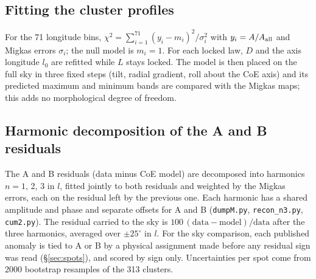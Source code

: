 \documentclass[10pt,twocolumn]{article}
\begin{document}
\subsection{Fitting the cluster profiles}
For the 71 longitude bins, $\chi^2=\sum_{i=1}^{71}(y_i-m_i)^2/\sigma_i^2$ with $y_i=A/A_{\rm all}$ and Migkas errors $\sigma_i$; the null model is $m_i=1$. For each locked law, $D$ and the axis longitude $l_0$ are refitted while $L$ stays locked. The model is then placed on the full sky in three fixed steps (tilt, radial gradient, roll about the CoE axis) and its predicted maximum and minimum bands are compared with the Migkas maps; this adds no morphological degree of freedom.

\subsection{Harmonic decomposition of the A and B residuals}
The A and B residuals (data minus CoE model) are decomposed into harmonics $n=1$, 2, 3 in $l$, fitted jointly to both residuals and weighted by the Migkas errors, each on the residual left by the previous one. Each harmonic has a shared amplitude and phase and separate offsets for A and B (\texttt{dumpM.py}, \texttt{recon\_n3.py}, \texttt{cum2.py}). The residual carried to the sky is $100\,(\mathrm{data}-\mathrm{model})/\mathrm{data}$ after the three harmonics, averaged over $\pm25^\circ$ in $l$. For the sky comparison, each published anomaly is tied to A or B by a physical assignment made before any residual sign was read (\S\ref{sec:spots}), and scored by sign only. Uncertainties per spot come from 2000 bootstrap resamples of the 313 clusters.
\end{document}
